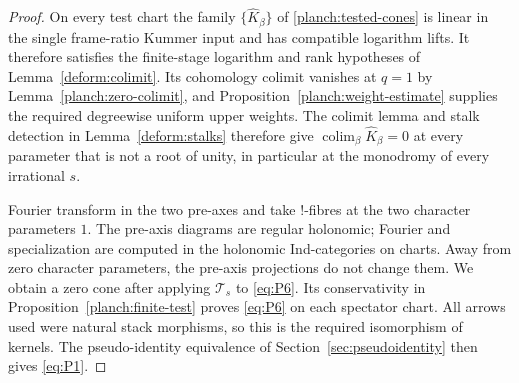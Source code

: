 \begin{proof}
On every test chart the family $\{\widehat K_\beta\}$ of
\eqref{planch:tested-cones} is linear in the single frame-ratio Kummer
input and has compatible logarithm lifts.  It therefore satisfies
the finite-stage logarithm and rank hypotheses of
Lemma~\ref{deform:colimit}.  Its cohomology colimit vanishes at
$q=1$ by Lemma~\ref{planch:zero-colimit}, and
Proposition~\ref{planch:weight-estimate} supplies the required
degreewise uniform upper weights.  The colimit lemma and stalk
detection in Lemma~\ref{deform:stalks} therefore give
$\operatorname*{colim}_\beta\widehat K_\beta=0$ at every parameter
that is not a root of unity, in particular at the monodromy of every
irrational $s$.

Fourier transform in the two pre-axes and take $!$-fibres at the
two character parameters $1$.  The pre-axis diagrams are regular
holonomic; Fourier and specialization are computed in the holonomic
Ind-categories on charts.  Away from zero character parameters, the pre-axis
projections do not change them.  We obtain a zero cone after
applying $\mathcal T_s$ to \eqref{eq:P6}.  Its conservativity in
Proposition~\ref{planch:finite-test} proves \eqref{eq:P6} on each
spectator chart.  All arrows used were natural stack morphisms,
so this is the required isomorphism of kernels.  The
pseudo-identity equivalence of Section~\ref{sec:pseudoidentity}
then gives \eqref{eq:P1}.
\end{proof}

